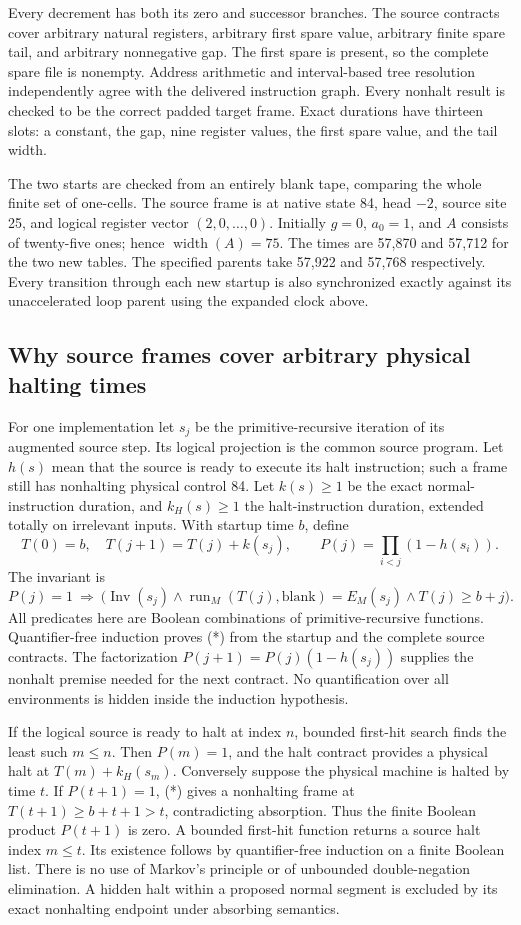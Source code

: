 Every decrement has both its zero and successor branches. The source
contracts cover arbitrary natural registers, arbitrary first spare value,
arbitrary finite spare tail, and arbitrary nonnegative gap. The first spare
is present, so the complete spare file is nonempty. Address arithmetic and
interval-based tree resolution independently agree with the delivered
instruction graph. Every nonhalt result is checked to be the correct
padded target frame. Exact durations have thirteen slots: a constant, the
gap, nine register values, the first spare value, and the tail width.

The two starts are checked from an entirely blank tape, comparing the whole
finite set of one-cells. The source frame is at native state 84, head $-2$,
source site 25, and logical register vector $(2,0,\ldots,0)$.
Initially $g=0$, $a_0=1$, and $A$ consists of twenty-five ones; hence
$\operatorname{width}(A)=75$. The times are 57,870 and 57,712 for the two
new tables. The specified parents take 57,922 and 57,768 respectively.
Every transition through each new startup is also synchronized exactly
against its unaccelerated loop parent using the expanded clock above.

\subsection{Why source frames cover arbitrary physical halting times}
For one implementation let $s_j$ be the primitive-recursive iteration of
its augmented source step. Its logical projection is the common source
program. Let $h(s)$ mean that the source is ready to execute its halt
instruction; such a frame still has nonhalting physical control 84.
Let $k(s)\ge1$ be the exact normal-instruction duration, and $k_H(s)\ge1$
the halt-instruction duration, extended totally on irrelevant inputs.
With startup time $b$, define
\[
T(0)=b,\quad T(j+1)=T(j)+k(s_j),\qquad
P(j)=\prod_{i<j}(1-h(s_i)).
\]
The invariant is
\[
P(j)=1\ \Longrightarrow\
\bigl(\operatorname{Inv}(s_j)\land
 \operatorname{run}_M(T(j),\mathrm{blank})=E_M(s_j)
 \land T(j)\ge b+j\bigr).
\tag{*}
\]
All predicates here are Boolean combinations of primitive-recursive
functions. Quantifier-free induction proves (*) from the startup and the
complete source contracts. The factorization
$P(j+1)=P(j)(1-h(s_j))$ supplies the nonhalt premise needed for the next
contract. No quantification over all environments is hidden inside the
induction hypothesis.

If the logical source is ready to halt at index $n$, bounded first-hit
search finds the least such $m\le n$. Then $P(m)=1$, and the halt contract
provides a physical halt at $T(m)+k_H(s_m)$. Conversely suppose the physical
machine is halted by time $t$. If $P(t+1)=1$, (*) gives a nonhalting frame
at $T(t+1)\ge b+t+1>t$, contradicting absorption. Thus the finite Boolean
product $P(t+1)$ is zero. A bounded first-hit function returns a source
halt index $m\le t$. Its existence follows by quantifier-free induction
on a finite Boolean list. There is no use of Markov's principle or of
unbounded double-negation elimination. A hidden halt within a proposed
normal segment is excluded by its exact nonhalting endpoint under
absorbing semantics.

